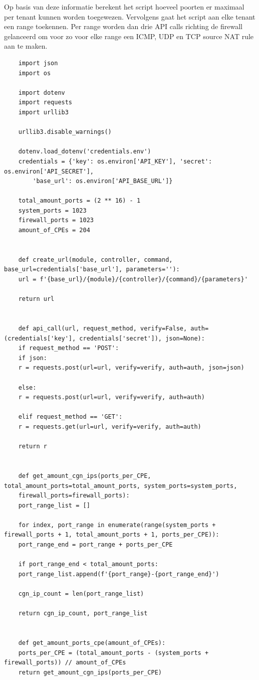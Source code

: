 Op basis van deze informatie berekent het script hoeveel poorten er maximaal per tenant kunnen worden toegewezen.
Vervolgens gaat het script aan elke tenant een range toekennen.
Per range worden dan drie API calls richting de firewall gelanceerd om voor zo voor elke range een ICMP, UDP en TCP source NAT rule aan te maken.

\begin{verbatim}
    import json
    import os

    import dotenv
    import requests
    import urllib3

    urllib3.disable_warnings()

    dotenv.load_dotenv('credentials.env')
    credentials = {'key': os.environ['API_KEY'], 'secret': os.environ['API_SECRET'],
        'base_url': os.environ['API_BASE_URL']}

    total_amount_ports = (2 ** 16) - 1
    system_ports = 1023
    firewall_ports = 1023
    amount_of_CPEs = 204


    def create_url(module, controller, command, base_url=credentials['base_url'], parameters=''):
    url = f'{base_url}/{module}/{controller}/{command}/{parameters}'

    return url


    def api_call(url, request_method, verify=False, auth=(credentials['key'], credentials['secret']), json=None):
    if request_method == 'POST':
    if json:
    r = requests.post(url=url, verify=verify, auth=auth, json=json)

    else:
    r = requests.post(url=url, verify=verify, auth=auth)

    elif request_method == 'GET':
    r = requests.get(url=url, verify=verify, auth=auth)

    return r


    def get_amount_cgn_ips(ports_per_CPE, total_amount_ports=total_amount_ports, system_ports=system_ports,
    firewall_ports=firewall_ports):
    port_range_list = []

    for index, port_range in enumerate(range(system_ports + firewall_ports + 1, total_amount_ports + 1, ports_per_CPE)):
    port_range_end = port_range + ports_per_CPE

    if port_range_end < total_amount_ports:
    port_range_list.append(f'{port_range}-{port_range_end}')

    cgn_ip_count = len(port_range_list)

    return cgn_ip_count, port_range_list


    def get_amount_ports_cpe(amount_of_CPEs):
    ports_per_CPE = (total_amount_ports - (system_ports + firewall_ports)) // amount_of_CPEs
    return get_amount_cgn_ips(ports_per_CPE)



\end{verbatim}
